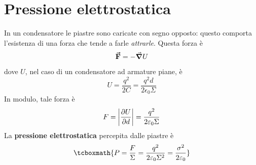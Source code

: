 \section{Pressione elettrostatica}
In un condensatore le piastre sono caricate con segno opposto: questo comporta l'esistenza di una forza che tende a farle \textit{attrarle}. Questa forza è
\begin{equation}
	\vb*{\va{F}}=-\grad{U}
\end{equation}
dove $U$, nel caso di un condensatore ad armature piane, è
\begin{equation*}
	U=\frac{q^2}{2C}=\frac{q^2d}{2\epsilon_0\Sigma}
\end{equation*}
In modulo, tale forza è
\begin{equation}
	F=\abs{\pdv{U}{d}}=\frac{q^2}{2\varepsilon_0\Sigma}
\end{equation}
La \textbf{pressione elettrostatica} percepita dalle piastre è
\begin{equation}
	\tcboxmath{P=\frac{F}{\Sigma}=\frac{q^2}{2\epsilon_0\Sigma^2}=\frac{\sigma^2}{2\epsilon_0}}
\end{equation}
